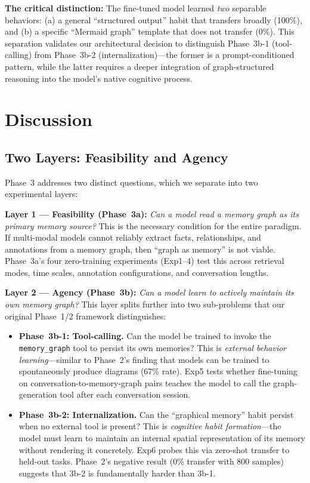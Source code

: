 \documentclass[11pt,a4paper]{article}
\begin{document}
\textbf{The critical distinction:} The fine-tuned model learned \textit{two} separable behaviors: (a) a general ``structured output'' habit that transfers broadly (100\%), and (b) a specific ``Mermaid graph'' template that does not transfer (0\%). This separation validates our architectural decision to distinguish Phase~3b-1 (tool-calling) from Phase~3b-2 (internalization)---the former is a prompt-conditioned pattern, while the latter requires a deeper integration of graph-structured reasoning into the model's native cognitive process.


\section{Discussion}

\subsection{Two Layers: Feasibility and Agency}

Phase~3 addresses two distinct questions, which we separate into two experimental layers:

\textbf{Layer 1 — Feasibility (Phase~3a):} \textit{Can a model read a memory graph as its primary memory source?} This is the necessary condition for the entire paradigm. If multi-modal models cannot reliably extract facts, relationships, and annotations from a memory graph, then ``graph as memory'' is not viable. Phase~3a's four zero-training experiments (Exp1--4) test this across retrieval modes, time scales, annotation configurations, and conversation lengths.

\textbf{Layer 2 — Agency (Phase~3b):} \textit{Can a model learn to actively maintain its own memory graph?} This layer splits further into two sub-problems that our original Phase~1/2 framework distinguishes:

\begin{itemize}[nosep]
\item \textbf{Phase~3b-1: Tool-calling.} Can the model be trained to invoke the \texttt{memory\_graph} tool to persist its own memories? This is \textit{external behavior learning}---similar to Phase~2's finding that models can be trained to spontaneously produce diagrams (67\% rate). Exp5 tests whether fine-tuning on conversation-to-memory-graph pairs teaches the model to call the graph-generation tool after each conversation session.
\item \textbf{Phase~3b-2: Internalization.} Can the ``graphical memory'' habit persist when no external tool is present? This is \textit{cognitive habit formation}---the model must learn to maintain an internal spatial representation of its memory without rendering it concretely. Exp6 probes this via zero-shot transfer to held-out tasks. Phase~2's negative result (0\% transfer with 800 samples) suggests that 3b-2 is fundamentally harder than 3b-1.
\end{itemize}
\end{document}
